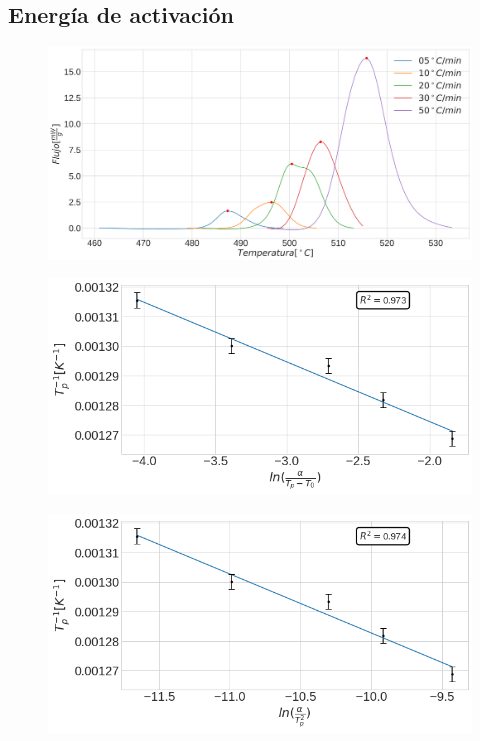 \documentclass[11pt]{beamer}
\begin{document}
	\subsection{Energía de activación}
	\begin{frame}
		\begin{figure}
			\includegraphics[scale=0.4]{img/DSCPeaks.png}
		\end{figure}
		\begin{figure}
			\includegraphics[scale=0.4]{img/Augis_bennet.png}
		\end{figure}
		\begin{figure}
			\includegraphics[scale=0.4]{img/Kissinger.png}
		\end{figure}
	\end{frame}
\end{document}
